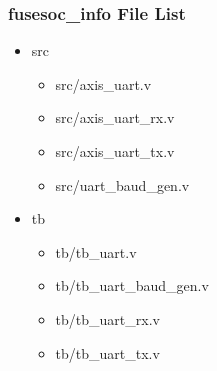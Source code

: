 \subsubsection{fusesoc\_info File List}
\begin{itemize}
\item src
	\begin{itemize}
	\item src/axis\_uart.v
	\item src/axis\_uart\_rx.v
	\item src/axis\_uart\_tx.v
	\item src/uart\_baud\_gen.v
	\end{itemize}
\item tb
	\begin{itemize}
	\item tb/tb\_uart.v
	\item tb/tb\_uart\_baud\_gen.v
	\item tb/tb\_uart\_rx.v
	\item tb/tb\_uart\_tx.v
	\end{itemize}
\end{itemize}
